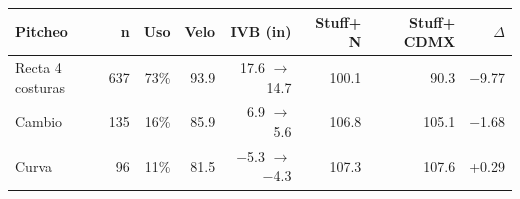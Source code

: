 \begin{tabular}{lrrrrrrr}
\toprule
Pitcheo & n & Uso & Velo & IVB (in) & Stuff+ N & Stuff+ CDMX & $\Delta$ \\
\midrule
Recta 4 costuras & 637 & 73\% & 93.9 & 17.6 $\to$ 14.7 & 100.1 & 90.3 & \ensuremath{-}9.77 \\
Cambio & 135 & 16\% & 85.9 & 6.9 $\to$ 5.6 & 106.8 & 105.1 & \ensuremath{-}1.68 \\
Curva & 96 & 11\% & 81.5 & \ensuremath{-}5.3 $\to$ \ensuremath{-}4.3 & 107.3 & 107.6 & +0.29 \\
\bottomrule
\end{tabular}
